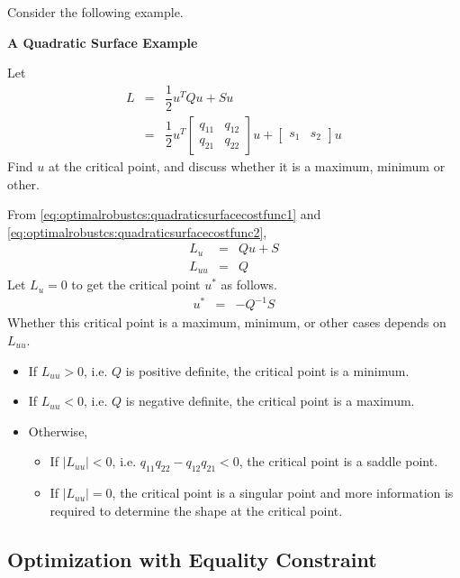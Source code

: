 Consider the following example.
\begin{mdframed}
\noindent \textbf{A Quadratic Surface Example}

Let
\begin{eqnarray}
	L &=& \dfrac{1}{2}u^TQu + Su \label{eq:optimalrobustcs:quadraticsurfacecostfunc1} \\
	&=& \dfrac{1}{2}u^T\left[\begin{array}{cc}
		q_{11} & q_{12} \\
		q_{21} & q_{22}
	\end{array}\right]u + \left[\begin{array}{cc}
	s_1 & s_2
	\end{array}\right]u \label{eq:optimalrobustcs:quadraticsurfacecostfunc2}
\end{eqnarray}
Find $u$ at the critical point, and discuss whether it is a maximum, minimum or other.

\end{mdframed}

From \eqref{eq:optimalrobustcs:quadraticsurfacecostfunc1} and \eqref{eq:optimalrobustcs:quadraticsurfacecostfunc2},
\begin{eqnarray}
	L_u &=& Qu + S \nonumber \\
	L_{uu} &=& Q \nonumber
\end{eqnarray}
Let $L_u=0$ to get the critical point $u^*$ as follows.
\begin{eqnarray}
	u^* &=& -Q^{-1}S \nonumber
\end{eqnarray}
Whether this critical point is a maximum, minimum, or other cases depends on $L_{uu}$.
\begin{itemize}
	\item If $L_{uu}>0$, i.e. $Q$ is positive definite, the critical point is a minimum.
	\item If $L_{uu}<0$, i.e. $Q$ is negative definite, the critical point is a maximum.
	\item Otherwise, \begin{itemize}
		\item If $|L_{uu}|<0$, i.e. $q_{11}q_{22}-q_{12}q_{21}<0$, the critical point is a saddle point.
		\item If $|L_{uu}|=0$, the critical point is a singular point and more information is required to determine the shape at the critical point.
	\end{itemize}
\end{itemize}

\subsection{Optimization with Equality Constraint}

